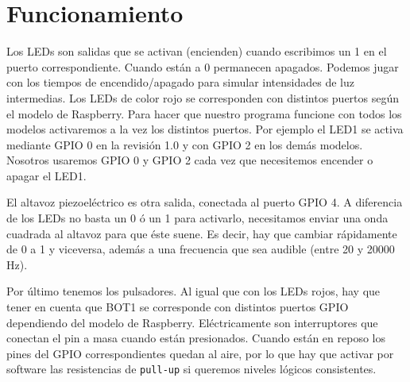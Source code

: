 \section{Funcionamiento}

Los LEDs son salidas que se activan (encienden) cuando escribimos un 1
en el puerto correspondiente. Cuando están a 0 permanecen apagados. Podemos
jugar con los tiempos de encendido/apagado para simular intensidades de luz
intermedias. Los LEDs de color rojo se corresponden con distintos puertos
según el modelo de Raspberry. Para hacer que nuestro programa funcione con
todos los modelos activaremos a la vez los distintos puertos. Por ejemplo
el LED1 se activa mediante GPIO 0 en la revisión 1.0 y con GPIO 2 en los demás
modelos. Nosotros usaremos GPIO 0 y GPIO 2 cada vez que necesitemos
encender o apagar el LED1.

El altavoz piezoeléctrico es otra salida, conectada al puerto GPIO 4. A diferencia
de los LEDs no basta un 0 ó un 1 para activarlo, necesitamos enviar una onda
cuadrada al altavoz para que éste suene. Es decir, hay que cambiar rápidamente de
0 a 1 y viceversa, además a una frecuencia que sea audible (entre 20 y 20000 Hz).

Por último tenemos los pulsadores. Al igual que con los LEDs rojos, hay que tener
en cuenta que BOT1 se corresponde con distintos puertos GPIO dependiendo del modelo
de Raspberry. Eléctricamente son interruptores que conectan el pin a masa cuando
están presionados. Cuando están en reposo los pines del GPIO correspondientes
quedan al aire, por lo que hay que activar por software las resistencias de
{\tt pull-up} si queremos niveles lógicos consistentes.

\chapterend{}


